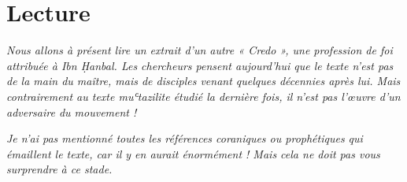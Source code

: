 \hypertarget{lecture}{%
\section{Lecture}\label{lecture}}


\emph{Nous allons à présent lire un extrait d'un autre « Credo », une
profession de foi attribuée à Ibn Ḥanbal. Les chercheurs pensent
aujourd'hui que le texte n'est pas de la main du maître, mais de
disciples venant quelques décennies après lui. Mais contrairement au
texte muʿtazilite étudié la dernière fois, il n'est pas l'œuvre d'un
adversaire du mouvement !}

\emph{Je n'ai pas mentionné toutes les références coraniques ou
prophétiques qui émaillent le texte, car il y en aurait énormément ! Mais cela ne doit pas vous surprendre à
ce stade.}

